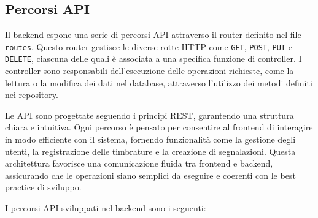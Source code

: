 \documentclass[twoside]{supsistudent}
\begin{document}
\subsection{Percorsi API}

Il backend espone una serie di percorsi API attraverso il router definito nel file \texttt{routes}. Questo router gestisce le diverse rotte HTTP come \texttt{GET}, \texttt{POST}, \texttt{PUT} e \texttt{DELETE}, ciascuna delle quali è associata a una specifica funzione di controller. I controller sono responsabili dell'esecuzione delle operazioni richieste, come la lettura o la modifica dei dati nel database, attraverso l'utilizzo dei metodi definiti nei repository.

Le API sono progettate seguendo i principi REST, garantendo una struttura chiara e intuitiva. Ogni percorso è pensato per consentire al frontend di interagire in modo efficiente con il sistema, fornendo funzionalità come la gestione degli utenti, la registrazione delle timbrature e la creazione di segnalazioni. Questa architettura favorisce una comunicazione fluida tra frontend e backend, assicurando che le operazioni siano semplici da eseguire e coerenti con le best practice di sviluppo.

I percorsi API sviluppati nel backend sono i seguenti:
\end{document}
